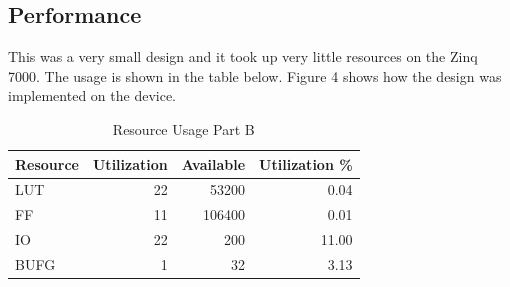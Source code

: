 \documentclass[letterpaper, 10 pt, conference]{IEEEconf}  %
\begin{document}
\subsection{Performance}
This was a very small design and it took up very little resources on the Zinq 7000. The usage is shown in the table below. Figure 4 shows how the design was implemented on the device.
\begin{table}[H]
\centering
\caption{Resource Usage Part B}
\label{table_example}
\begin{tabular}{|l|r|r|r|}
\hline
\rowcolor[HTML]{EFEFEF} 
Resource & \multicolumn{1}{l|}{\cellcolor[HTML]{EFEFEF}Utilization} & \multicolumn{1}{l|}{\cellcolor[HTML]{EFEFEF}Available} & \multicolumn{1}{l|}{\cellcolor[HTML]{EFEFEF}Utilization \%} \\ \hline
LUT      & 22                                                        & 53200                                                  & 0.04                                                        \\ \hline
FF       & 11                                                       & 106400                                                 & 0.01                                                        \\ \hline
IO       & 22                                                       & 200                                                    & 11.00                                                        \\ \hline
BUFG     & 1                                                        & 32                                                     & 3.13                                                        \\ \hline
\end{tabular}
\end{table}
\end{document}

